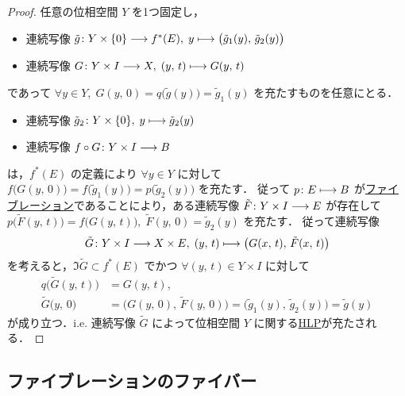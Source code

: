 \documentclass[algtopo_main]{subfiles}
\begin{document}
\begin{proof}
    任意の位相空間 $Y$ を1つ固定し，%
    \begin{itemize}
        \item 連続写像 $\tilde{g} \colon Y \times \{0\}\longrightarrow f^*(E),\; y \longmapsto \bigl( \tilde{g}_1(y),\, \tilde{g}_2 (y) \bigr) $
        \item 連続写像 $G \colon Y \times I \longrightarrow X,\; (y,\, t) \longmapsto G(y,\, t)$
    \end{itemize}
    であって $\forall y \in Y,\;G(y,\, 0) = q \bigl( \tilde{g}(y) \bigr) = \tilde{g}_1(y)$ を充たすものを任意にとる．
    \begin{itemize}
        \item 連続写像 $\tilde{g}_2 \colon Y \times \{0\},\; y \longmapsto \tilde{g}_2(y)$
        \item 連続写像 $f \circ G \colon Y \times I \longrightarrow B$
    \end{itemize}
    は，$f^*(E)$ の定義により $\forall y \in Y$ に対して 
    $f \bigl( G(y,\, 0) \bigr) = f \bigl( \tilde{g}_1(y) \bigr) = p \bigl( \tilde{g}_2(y) \bigr)$ を充たす．
    従って $p \colon E \longmapsto B$ が\hyperref[def:fibration]{ファイブレーション}であることにより，ある連続写像 $\tilde{F} \colon Y \times I \longrightarrow E$ が存在して
    $p \bigl( \tilde{F}(y,\, t) \bigr) = f \bigl( G(y,\, t) \bigr),\; \tilde{F}(y,\, 0) = \tilde{g}_2(y)$ を充たす．
    従って連続写像
    \begin{align}
        \tilde{G} \colon Y \times I \longrightarrow X \times E,\; (y,\, t) \longmapsto \bigl( G(x,\, t),\, \tilde{F}(x,\, t) \bigr) 
    \end{align}
    を考えると，$\Im \tilde{G} \subset f^*(E)$ でかつ $\forall (y,\, t) \in Y \times I$ に対して
    \begin{align}
        q \bigl( \tilde{G}(y,\, t) \bigr) &= G(y,\, t), \\
        \tilde{G} \bigl( y,\, 0 \bigr) &= \bigl( G(y,\, 0),\, \tilde{F}(y,\, 0) \bigr) = \bigl( \tilde{g}_1(y),\, \tilde{g}_2(y) \bigr) = \tilde{g}(y)
    \end{align}
    が成り立つ．i.e. 連続写像 $\tilde{G}$ によって位相空間 $Y$ に関する\hyperref[def:HLP]{HLP}が充たされる．
\end{proof}

\subsection{ファイブレーションのファイバー}
\end{document}
